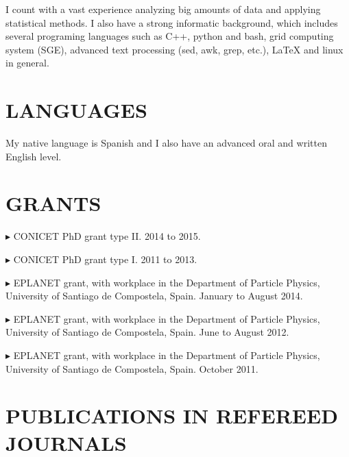 \documentclass[letterpaper]{article}
\renewenvironment{itemize}{
  \begin{list}{}{
    \setlength{\leftmargin}{1.5em}
  }
}{
  \end{list}
}
\begin{document}
I count with a vast experience analyzing big amounts of data and applying statistical methods. I also have a strong informatic background, which includes several programing languages such as C++, python and bash, grid computing system (SGE), advanced text processing (sed, awk, grep, etc.), \LaTeX{} and linux in general. 

\section*{LANGUAGES}

My native language is Spanish and I also have an advanced oral and written English level.

\section*{GRANTS} 
   \begin{itemize} %
   \item $\blacktriangleright$ CONICET PhD grant type II. 2014 to 2015. 
   \item $\blacktriangleright$ CONICET PhD grant type I. 2011 to 2013. 
   \item $\blacktriangleright$ EPLANET grant, with workplace in the Department of Particle Physics, University of Santiago de Compostela, Spain. January to August 2014.
   \item $\blacktriangleright$ EPLANET grant, with workplace in the Department of Particle Physics, University of Santiago de Compostela, Spain. June to August 2012.
   \item $\blacktriangleright$ EPLANET grant, with workplace in the Department of Particle Physics, University of Santiago de Compostela, Spain. October 2011.
 \end{itemize}

 
\section*{PUBLICATIONS IN REFEREED JOURNALS} 
\end{document}

